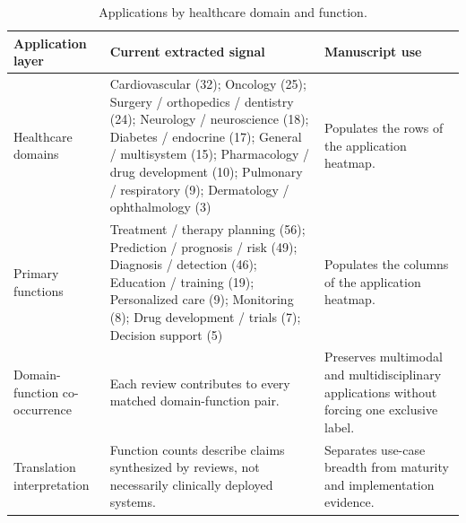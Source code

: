 \begin{table}[htbp]
\centering
\small
\caption{Applications by healthcare domain and function.}
\label{tab:applications}
\begin{tabularx}{\textwidth}{@{}>{\raggedright\arraybackslash}p{}YY@{}}
\toprule
\textbf{Application layer} & \textbf{Current extracted signal} & \textbf{Manuscript use} \\
\midrule
Healthcare domains & Cardiovascular (32); Oncology (25); Surgery / orthopedics / dentistry (24); Neurology / neuroscience (18); Diabetes / endocrine (17); General / multisystem (15); Pharmacology / drug development (10); Pulmonary / respiratory (9); Dermatology / ophthalmology (3) & Populates the rows of the application heatmap. \\
Primary functions & Treatment / therapy planning (56); Prediction / prognosis / risk (49); Diagnosis / detection (46); Education / training (19); Personalized care (9); Monitoring (8); Drug development / trials (7); Decision support (5) & Populates the columns of the application heatmap. \\
Domain-function co-occurrence & Each review contributes to every matched domain-function pair. & Preserves multimodal and multidisciplinary applications without forcing one exclusive label. \\
Translation interpretation & Function counts describe claims synthesized by reviews, not necessarily clinically deployed systems. & Separates use-case breadth from maturity and implementation evidence. \\
\bottomrule
\end{tabularx}
\end{table}
